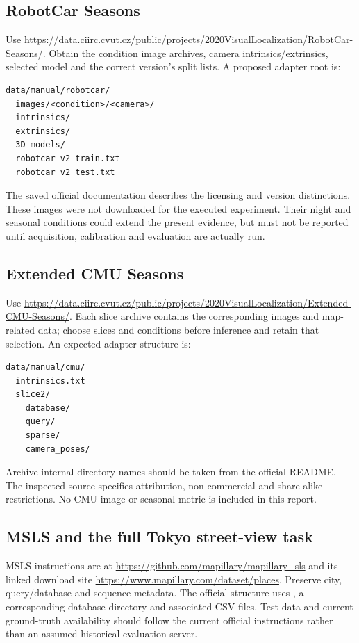 \subsection{RobotCar Seasons}
Use \url{https://data.ciirc.cvut.cz/public/projects/2020VisualLocalization/RobotCar-Seasons/}. Obtain the condition image archives, camera intrinsics/extrinsics, selected model and the correct version's split lists. A proposed adapter root is:
\begin{lstlisting}[numbers=none]
data/manual/robotcar/
  images/<condition>/<camera>/
  intrinsics/
  extrinsics/
  3D-models/
  robotcar_v2_train.txt
  robotcar_v2_test.txt
\end{lstlisting}
The saved official documentation describes the licensing and version distinctions. These images were not downloaded for the executed experiment. Their night and seasonal conditions could extend the present evidence, but must not be reported until acquisition, calibration and evaluation are actually run.

\subsection{Extended CMU Seasons}
Use \url{https://data.ciirc.cvut.cz/public/projects/2020VisualLocalization/Extended-CMU-Seasons/}. Each slice archive contains the corresponding images and map-related data; choose slices and conditions before inference and retain that selection. An expected adapter structure is:
\begin{lstlisting}[numbers=none]
data/manual/cmu/
  intrinsics.txt
  slice2/
    database/
    query/
    sparse/
    camera_poses/
\end{lstlisting}
Archive-internal directory names should be taken from the official README. The inspected source specifies attribution, non-commercial and share-alike restrictions. No CMU image or seasonal metric is included in this report.

\subsection{MSLS and the full Tokyo street-view task}
MSLS instructions are at \url{https://github.com/mapillary/mapillary_sls} and its linked download site \url{https://www.mapillary.com/dataset/places}. Preserve city, query/database and sequence metadata. The official structure uses , a corresponding database directory and associated CSV files. Test data and current ground-truth availability should follow the current official instructions rather than an assumed historical evaluation server.

